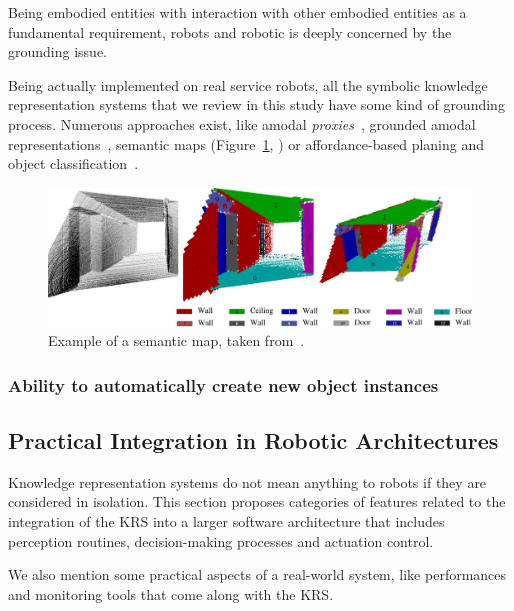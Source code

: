 \documentclass[a4paper, twocolumn]{article}
\begin{document}
Being embodied entities with interaction with other embodied entities as a
fundamental requirement, robots and robotic is deeply concerned by the
grounding issue.

Being actually implemented on real service robots, all the symbolic knowledge
representation systems that we review in this study have some kind of grounding
process. Numerous approaches exist, like amodal
\emph{proxies}~\cite{Jacobsson2008}, grounded amodal
representations~\cite{Alami2011, Mavridis2006}, semantic maps
(Figure~\ref{fig|semanticmap}, \cite{Nuechter2008, Galindo2008,Blodow2011}) or
affordance-based planing and object classification~\cite{Lorken2008,
Varadarajan2011}.

\begin{figure}
    \centering
    \includegraphics[width=0.9\columnwidth]{semanticmaps_hertzberg.png}
    \caption{Example of a semantic map, taken from~\cite{Nuechter2008}.}
    \label{fig|semanticmap}
\end{figure}

\subsubsection{Ability to automatically create new object instances}
\label{sect|new-instances}

\subsection{Practical Integration in Robotic Architectures}
\label{sect|integration-robot}

Knowledge representation systems do not mean anything to robots if they are
considered in isolation. This section proposes categories of features related
to the integration of the KRS into a larger software architecture that includes
perception routines, decision-making processes and actuation control.

We also mention some practical aspects of a real-world system, like
performances and monitoring tools that come along with the KRS.
\end{document}
